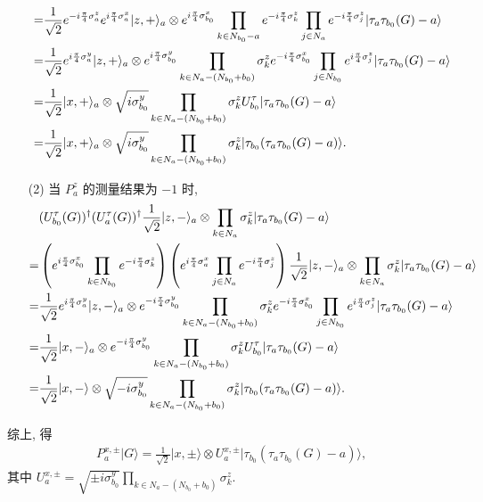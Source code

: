 \documentclass{assignment}
\begin{document}
\begin{pf}
\begin{itemize}
\begin{align}
            \notag=&\frac{1}{\sqrt{2}}e^{-i\frac{\pi}{4}\sigma_a^z}e^{i\frac{\pi}{4}\sigma_a^x}\lvert z,+\rangle_a\otimes e^{i\frac{\pi}{4}\sigma_{b_0}^x}\prod_{k\in N_{b_0}-a}e^{-i\frac{\pi}{4}\sigma_k^z}\prod_{j\in N_a}e^{-i\frac{\pi}{4}\sigma_j^z}\lvert\tau_a\tau_{b_0}(G)-a\rangle\\
            \notag=&\frac{1}{\sqrt{2}}e^{i\frac{\pi}{4}\sigma_a^y}\lvert z,+\rangle_a\otimes e^{i\frac{\pi}{4}\sigma_{b_0}^y}\prod_{k\in N_a-(N_{b_0}+b_0)}\sigma_k^ze^{-i\frac{\pi}{4}\sigma_{b_0}^x}\prod_{j\in N_{b_0}}e^{i\frac{\pi}{4}\sigma_j^z}\lvert\tau_a\tau_{b_0}(G)-a\rangle\\
            \notag=&\frac{1}{\sqrt{2}}\lvert x,+\rangle_a\otimes\sqrt{i\sigma_{b_0}^y}\prod_{k\in N_a-(N_{b_0}+b_0)}\sigma_k^zU_{b_0}^{\tau}\lvert\tau_a\tau_{b_0}(G)-a\rangle\\
            =&\frac{1}{\sqrt{2}}\lvert x,+\rangle_a\otimes\sqrt{i\sigma_{b_0}^y}\prod_{k\in N_a-(N_{b_0}+b_0)}\sigma_k^z\lvert\tau_{b_0}(\tau_a\tau_{b_0}(G)-a)\rangle.
        \end{align}
        \item[(2)] 当 $P_a^z$ 的测量结果为 $-1$ 时,
        \begin{align}
            \notag&(U_{b_0}^{\tau}(G))^{\dagger}(U_a^{\tau}(G))^{\dagger}\frac{1}{\sqrt{2}}\lvert z,-\rangle_a\otimes\prod_{k\in N_a}\sigma_k^z\lvert\tau_a\tau_{b_0}(G)-a\rangle\\
            \notag=&\left(e^{i\frac{\pi}{4}\sigma_{b_0}^x}\prod_{k\in N_{b_0}}e^{-i\frac{\pi}{4}\sigma_k^z}\right)\left(e^{i\frac{\pi}{4}\sigma_a^x}\prod_{j\in N_a}e^{-i\frac{\pi}{4}\sigma_j^z}\right)\frac{1}{\sqrt{2}}\lvert z,-\rangle_a\otimes\prod_{k\in N_a}\sigma_k^z\lvert\tau_a\tau_{b_0}(G)-a\rangle\\
            \notag=&\frac{1}{\sqrt{2}}e^{i\frac{\pi}{4}\sigma_a^y}\lvert z,-\rangle_a\otimes e^{-i\frac{\pi}{4}\sigma_{b_0}^y}\prod_{k\in N_a-(N_{b_0}+b_0)}\sigma_k^ze^{-i\frac{\pi}{4}\sigma_{b_0}^x}\prod_{j\in N_{b_0}}e^{i\frac{\pi}{4}\sigma_j^z}\lvert\tau_a\tau_{b_0}(G)-a\rangle\\
            \notag=&\frac{1}{\sqrt{2}}\lvert x,-\rangle_a\otimes e^{-i\frac{\pi}{4}\sigma_{b_0}^y}\prod_{k\in N_a-(N_{b_0}+b_0)}\sigma_k^zU_{b_0}^{\tau}\lvert\tau_a\tau_{b_0}(G)-a\rangle\\
            =&\frac{1}{\sqrt{2}}\lvert x,-\rangle\otimes\sqrt{-i\sigma_{b_0}^y}\prod_{k\in N_a-(N_{b_0}+b_0)}\sigma_k^z\lvert\tau_{b_0}(\tau_a\tau_{b_0}(G)-a)\rangle.
        \end{align}
    \end{itemize}
    综上, 得
    \begin{align}
        P_a^{x,\pm}\lvert G\rangle=\frac{1}{\sqrt{2}}\lvert x,\pm\rangle\otimes U_a^{x,\pm}\lvert\tau_{b_0}(\tau_a\tau_{b_0}(G)-a)\rangle,
    \end{align}
    其中 $U_a^{x,\pm}=\sqrt{\pm i\sigma_{b_0}^y}\prod_{k\in N_a-(N_{b_0}+b_0)}\sigma_k^z$.
\end{pf}
\end{document}
